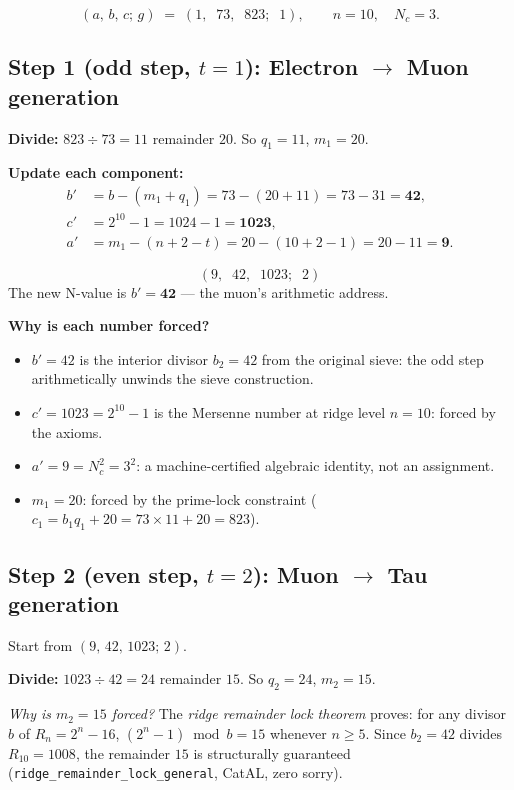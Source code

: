 \documentclass[11pt,a4paper]{article}
\newcommand{\lean}[1]{\texttt{#1}}
\newcommand{\Nc}{N_c}
\newcommand{\CatAL}{\textsf{CatAL}}
\begin{document}
\[
  (a,\,b,\,c;\,g) \;=\; (1,\;\;73,\;\;823;\;\;1), \qquad n = 10, \quad \Nc = 3.
\]

\subsection{Step 1 (odd step, $t=1$): Electron $\to$ Muon generation}

\textbf{Divide:} $823 \div 73 = 11$ remainder $20$.  So $q_1 = 11$, $m_1 = 20$.

\textbf{Update each component:}
\begin{align*}
  b' &= b - (m_1 + q_1) = 73 - (20 + 11) = 73 - 31 = \mathbf{42}, \\[4pt]
  c' &= 2^{10} - 1 = 1024 - 1 = \mathbf{1023}, \\[4pt]
  a' &= m_1 - (n + 2 - t) = 20 - (10 + 2 - 1) = 20 - 11 = \mathbf{9}.
\end{align*}

\begin{tcolorbox}[colback=boxgreen,colframe=green!50!black,title=Result: Muon triple]
\[
  (9,\;\;42,\;\;1023;\;\;2)
\]
The new N-value is $b' = \mathbf{42}$ --- the muon's arithmetic address.
\end{tcolorbox}

\noindent\textbf{Why is each number forced?}
\begin{itemize}[itemsep=2pt]
  \item $b' = 42$ is the interior divisor $b_2 = 42$ from the original sieve: the
    odd step arithmetically unwinds the sieve construction.
  \item $c' = 1023 = 2^{10} - 1$ is the Mersenne number at ridge level $n = 10$:
    forced by the axioms.
  \item $a' = 9 = \Nc^2 = 3^2$: a machine-certified algebraic identity, not an
    assignment.
  \item $m_1 = 20$: forced by the prime-lock constraint
    ($c_1 = b_1 q_1 + 20 = 73 \times 11 + 20 = 823$).
\end{itemize}

\subsection{Step 2 (even step, $t=2$): Muon $\to$ Tau generation}

Start from $(9,\,42,\,1023;\,2)$.

\textbf{Divide:} $1023 \div 42 = 24$ remainder $15$.  So $q_2 = 24$, $m_2 = 15$.

\medskip
\noindent\textit{Why is $m_2 = 15$ forced?}  The \emph{ridge remainder lock theorem}
proves: for any divisor $b$ of $R_n = 2^n - 16$,
$(2^n - 1) \bmod b = 15$ whenever $n \geq 5$.  Since $b_2 = 42$ divides
$R_{10} = 1008$, the remainder $15$ is structurally guaranteed
(\lean{ridge\_remainder\_lock\_general}, \CatAL, zero sorry).
\end{document}
